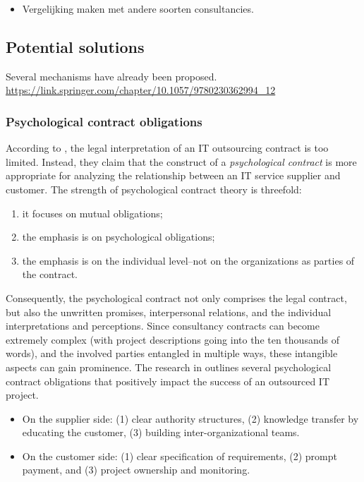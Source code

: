 \documentclass[12pt]{article}
\providecommand{\tightlist}{%
  \setlength{\itemsep}{0pt}\setlength{\parskip}{0pt}}
\begin{document}
\begin{itemize}
\tightlist
\item
  Vergelijking maken met andere soorten consultancies.
\end{itemize}

\hypertarget{potential-solutions}{%
\subsection{Potential solutions}\label{potential-solutions}}

Several mechanisms have already been proposed.
\url{https://link.springer.com/chapter/10.1057/9780230362994_12}

\hypertarget{psychological-contract-obligations}{%
\subsubsection{Psychological contract
obligations}\label{psychological-contract-obligations}}

According to \citet[357]{ang2004}, the legal interpretation of an IT
outsourcing contract is too limited. Instead, they claim that the
construct of a \emph{psychological contract} is more appropriate for
analyzing the relationship between an IT service supplier and customer.
The strength of psychological contract theory is threefold:

\begin{enumerate}
\def\labelenumi{\arabic{enumi}.}
\tightlist
\item
  it focuses on mutual obligations;
\item
  the emphasis is on psychological obligations;
\item
  the emphasis is on the individual level--not on the organizations as
  parties of the contract.
\end{enumerate}

Consequently, the psychological contract not only comprises the legal
contract, but also the unwritten promises, interpersonal relations, and
the individual interpretations and perceptions. Since consultancy
contracts can become extremely complex (with project descriptions going
into the ten thousands of words), and the involved parties entangled in
multiple ways, these intangible aspects can gain prominence. The
research in \citet[369-70]{ang2004} outlines several psychological
contract obligations that positively impact the success of an outsourced
IT project.

\begin{itemize}
\tightlist
\item
  On the supplier side: (1) clear authority structures, (2) knowledge
  transfer by educating the customer, (3) building inter-organizational
  teams.
\item
  On the customer side: (1) clear specification of requirements, (2)
  prompt payment, and (3) project ownership and monitoring.
\end{itemize}
\end{document}
